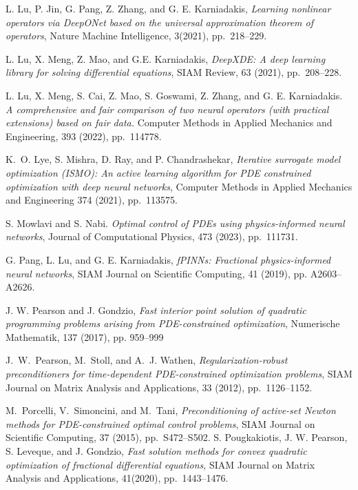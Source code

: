 \documentclass[final]{siamart171218}
\theoremstyle{remark}
\begin{document}
\begin{thebibliography}{10}
	L. Lu, P. Jin, G. Pang, Z. Zhang, and G. E. Karniadakis, {\em Learning nonlinear operators via DeepONet based on the universal approximation theorem of operators}, Nature Machine Intelligence, 3(2021), pp.~218--229.
	
	L. Lu, X. Meng, Z. Mao, and G.E. Karniadakis, {\em DeepXDE: A deep learning library for solving differential equations}, SIAM Review, 63 (2021), pp.~208--228.
	
	L. Lu, X. Meng, S. Cai, Z. Mao, S. Goswami, Z. Zhang, and G. E. Karniadakis. {\em A comprehensive and fair comparison of two neural operators (with practical extensions) based on fair data.} Computer Methods in Applied Mechanics and Engineering, 393 (2022), pp.~114778.
	
	{ K.~O. Lye, S. Mishra, D. Ray, and P. Chandrashekar,} {\em Iterative surrogate model optimization (ISMO): An active learning algorithm for PDE constrained optimization with deep neural networks}, Computer Methods in Applied Mechanics and Engineering 374 (2021), pp.~113575.
	
	S. Mowlavi and S. Nabi. {\em Optimal control of PDEs using physics-informed neural networks}, Journal of Computational Physics, 473  (2023), pp.~111731.
	
	
	G. Pang, L. Lu, and G. E. Karniadakis, {\em fPINNs: Fractional physics-informed neural networks}, SIAM Journal on Scientific Computing, 41 (2019), pp. A2603--A2626.
	
J. W. Pearson and J. Gondzio, {\em Fast interior point solution of quadratic programming
problems arising from PDE-constrained optimization}, Numerische Mathematik, 137
(2017), pp. 959--999
	
	
	{ J.~W.~Pearson, M.~Stoll, and A.~J. Wathen}, {\em Regularization-robust preconditioners for time-dependent PDE-constrained optimization problems},
	SIAM Journal on Matrix Analysis and Applications, 33 (2012), pp.~1126--1152.
	

	
	 { M.~Porcelli, V.~Simoncini, and M.~Tani}, {\em Preconditioning of active-set Newton methods for PDE-constrained optimal control problems}, SIAM Journal on Scientific Computing, 37 (2015), pp.~S472--S502.
%	
S. Pougkakiotis,  J. W. Pearson, S. Leveque,  and J. Gondzio,   {\em Fast solution methods for convex quadratic optimization of fractional differential equations}, SIAM Journal on Matrix Analysis and Applications, 41(2020), pp.~1443--1476.


\end{thebibliography}
\end{document}
